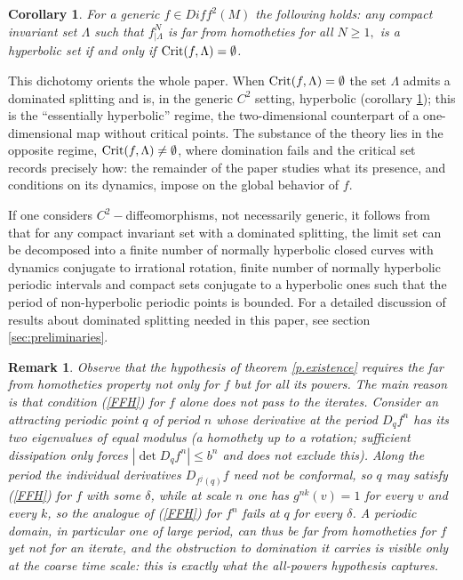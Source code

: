 \documentclass[a4paper,11pt]{article}
\newtheorem{corollary}[lemma]{Corollary}
\newtheorem{remark}[lemma]{Remark}
\theoremstyle{definition}
\def\La{\Lambda}
\def\de{\delta}
\def\La{\Lambda}
\begin{document}
\begin{corollary}\label{cor:mane2d}
For a generic $f\in Diff^2(M)$ the following holds: any compact invariant set
$\La$ such that $f^N_{|\La}$ is far from homotheties for all $N\geq 1,$ is a hyperbolic set if and
only if ${\rm Crit}(f,\La)=\emptyset$.
\end{corollary}

This dichotomy orients the whole paper. When ${\rm Crit}(f,\La)=\emptyset$
the set $\La$ admits a dominated splitting and is, in the generic $C^2$
setting, hyperbolic (corollary \ref{cor:mane2d}); this is the
``essentially hyperbolic'' regime, the two-dimensional counterpart of a
one-dimensional map without critical points. The substance of the theory
lies in the opposite regime, ${\rm Crit}(f,\La)\neq\emptyset$, where
domination fails and the critical set records precisely how: the remainder
of the paper studies what its presence, and conditions on its dynamics,
impose on the global behavior of $f$.


If one considers $C^2-$diffeomorphisms, not necessarily generic, it follows from \cite{PS2} that for any compact invariant set with a dominated splitting,  the limit set  can be decomposed into a finite number of normally hyperbolic closed curves with dynamics conjugate to irrational rotation, finite number of normally hyperbolic periodic intervals and compact sets conjugate to a hyperbolic ones such that the period of non-hyperbolic periodic points is bounded. For a detailed discussion of results about dominated splitting needed in this paper, see section \ref{sec:preliminaries}.  

\begin{remark}\label{rmk:why-powers}
Observe that the hypothesis of theorem \ref{p.existence} requires the far from
homotheties property not only for $f$ but for all its powers. The main reason is that  condition (\ref{FFH}) for $f$ alone does not pass
to the iterates. Consider an attracting periodic point $q$ of period $n$
whose derivative at the period $D_qf^{n}$ has its two eigenvalues of equal
modulus (a homothety up to a rotation; sufficient dissipation only forces
$|\det D_qf^{n}|\leq b^{n}$ and does not exclude this). Along the period the
individual derivatives $D_{f^j(q)}f$ need not be conformal, so $q$ may
satisfy (\ref{FFH}) for $f$ with some $\de$, while at scale $n$ one has
$g^{nk}(v)=1$ for every $v$ and every $k$, so the analogue of (\ref{FFH})
for $f^{n}$ fails at $q$ for every $\de$. A periodic domain, in
particular one of large period, can thus be far from homotheties for $f$
yet not for an iterate, and the obstruction to domination it carries is
visible only at the coarse time scale: this is exactly what the all-powers
hypothesis captures.
\end{remark}
\end{document}
